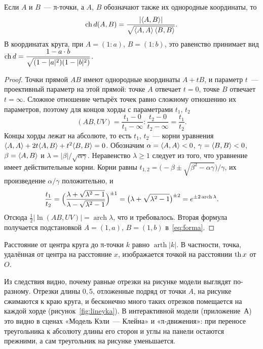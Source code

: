 \begin{proposition}\label{prop:ch}
Если $A$ и $B$~--- π-точки, а $A$, $B$ обозначают также их однородные координаты, то
\begin{equation}\label{eq:ch}
\operatorname{ch} d(A,B)=\frac{|\langle A,B\rangle|}{\sqrt{\langle A,A\rangle\,\langle B,B\rangle}}.
\end{equation}
В координатах круга, при $A=(1:a)$, $B=(1:b)$, это равенство принимает вид $\operatorname{ch} d=\dfrac{1-a\cdot b}{\sqrt{(1-|a|^2)(1-|b|^2)}}$.
\end{proposition}
\begin{proof}
Точки прямой $AB$ имеют однородные координаты $A+tB$, и параметр $t$~--- проективный параметр на этой прямой: точке $A$ отвечает $t=0$, точке $B$ отвечает $t=\infty$. Сложное отношение четырёх точек равно сложному отношению их параметров, поэтому для концов хорды с параметрами $t_1$, $t_2$
\[
(AB,UV)=\frac{t_1-0}{t_1-\infty}:\frac{t_2-0}{t_2-\infty}=\frac{t_1}{t_2}.
\]
Концы хорды лежат на абсолюте, то есть $t_1$, $t_2$~--- корни уравнения $\langle A,A\rangle+2t\langle A,B\rangle+t^2\langle B,B\rangle=0$. Обозначим $\alpha=\langle A,A\rangle<0$, $\gamma=\langle B,B\rangle<0$, $\beta=\langle A,B\rangle$ и $\lambda=|\beta|/\sqrt{\alpha\gamma}$. Неравенство $\lambda\ge1$ следует из того, что уравнение имеет действительные корни. Корни равны $t_{1,2}=\bigl(-\beta\pm\sqrt{\beta^2-\alpha\gamma}\bigr)/\gamma$, их произведение $\alpha/\gamma$ положительно, и
\[
\frac{t_1}{t_2}=\Bigl(\frac{\lambda+\sqrt{\lambda^2-1}}{\lambda-\sqrt{\lambda^2-1}}\Bigr)^{\pm1}=\bigl(\lambda+\sqrt{\lambda^2-1}\bigr)^{\pm2}=e^{\pm2\operatorname{arch}\lambda}.
\]
Отсюда $\tfrac12|\ln(AB,UV)|=\operatorname{arch}\lambda$, что и требовалось. Вторая формула получается подстановкой $A=(1,a)$, $B=(1,b)$ в~\eqref{eq:forma}.
\end{proof}

\begin{corollary}\label{cor:ot-centra}
Расстояние от центра круга до π-точки $k$ равно $\operatorname{arth}|k|$. В частности, точка, удалённая от центра на расстояние $x$, изображается точкой на расстоянии $\operatorname{th} x$ от $O$.
\end{corollary}

Из следствия видно, почему равные отрезки на рисунке модели выглядят по-разному. Отрезки длины $0{,}5$, отложенные подряд от точки $A$, на рисунке сжимаются к краю круга, и бесконечно много таких отрезков помещается на каждой хорде (рисунок~\ref{fig:lineyka}). В интерактивной модели (приложение~А) это видно в сценах «Модель Кэли~--- Клейна» и «π-движения»: при переносе треугольника к абсолюту длины его сторон и углы на панели остаются прежними, а сам треугольник на рисунке уменьшается.

